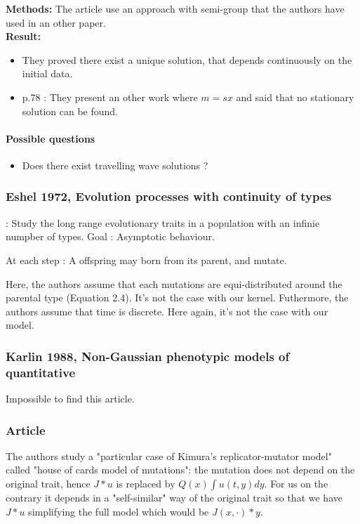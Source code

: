 \documentclass{article}
\begin{document}
\noindent\textbf{Methods:} The article use an approach with semi-group that the authors have used in an other paper. \\

\noindent\textbf{Result:} 
\begin{itemize}
    \item They proved there exist a unique solution, that depends continuously on the initial data.
    \item p.78 : They present an other work where $m = sx$ and said that no stationary solution can be found. 
\end{itemize}  



\paragraph{Possible questions}
\begin{itemize}
    \item Does there exist travelling wave solutions ?
\end{itemize}

\subsubsection{Eshel 1972, Evolution processes with continuity of types}: Study the long range evolutionary traits in a population with an infinie numpber of types. Goal : Asymptotic behaviour. 

At each step : A offspring may born from its parent, and mutate. 

Here, the authors assume that each mutations are equi-distributed around the parental type (Equation 2.4). It's not the case with our kernel. Futhermore, the authors assume that time is discrete. Here again, it's not the case with our model. \\

\subsubsection{Karlin 1988, Non-Gaussian phenotypic models of quantitative}
Impossible to find this article. \\

\subsubsection{Article~\cite{cloez2022fast}}

The authors study a "particular case of Kimura's replicator-mutator model" called "house of cards model of mutations": the mutation does not depend on the original trait, hence $J*u$ is replaced by $Q(x) \int u(t,y)dy.$ For us on the contrary it depends in a "self-similar" way of the original trait so that we have $J*u$ simplifying the full model which would be $J(x,\cdot) *y$.
\end{document}
